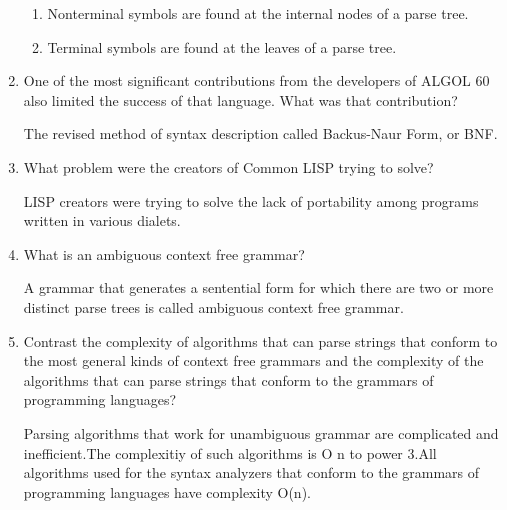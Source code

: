 \begin{enumerate}
  \begin{answer}

  \begin{enumerate}
    \item Nonterminal symbols are found at the internal nodes of a parse tree.
    \item Terminal symbols are found at the leaves of a parse tree. 
    \end{enumerate}

    \end{answer}


  \item One of the most significant contributions from the developers
    of ALGOL 60 also limited the success of that language. What was
    that contribution?

  \begin{answer}

    The revised method of syntax description called Backus-Naur Form, or BNF.

    \end{answer}

  \item What problem were the creators of Common LISP trying to solve?

  \begin{answer}

    LISP creators were trying to solve the lack of portability among programs written in various dialets.   

    \end{answer}

  \item What is an ambiguous context free grammar?

  \begin{answer}

    A grammar that generates a sentential form for which there are two or more distinct parse trees is called ambiguous context free grammar. 

    \end{answer}

  \item Contrast the complexity of algorithms that can parse strings
    that conform to the most general kinds of context free grammars
    and the complexity of the algorithms that can parse strings that
    conform to the grammars of programming languages?

  \begin{answer}

    Parsing algorithms that work for unambiguous grammar are complicated and inefficient.The complexitiy of such algorithms is O n to power 3.All algorithms used for the syntax analyzers that conform to the grammars of programming languages have complexity O(n).


\end{answer}
\end{enumerate}
